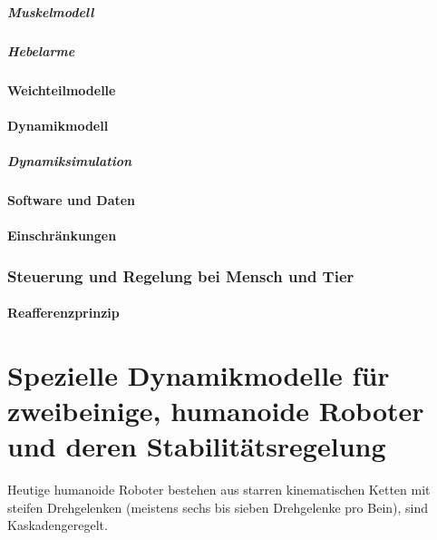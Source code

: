 \documentclass[a4paper, 11pt, accentcolor = tud3b]{tudreport}
\begin{document}
						\subparagraph{Muskelmodell} %

						\subparagraph{Hebelarme} %

					\paragraph{Weichteilmodelle} %

					\paragraph{Dynamikmodell} %

						\subparagraph{Dynamiksimulation} %

					\paragraph{Software und Daten} %

					\paragraph{Einschränkungen} %

				\subsubsection{Steuerung und Regelung bei Mensch und Tier} %

					\paragraph{Reafferenzprinzip} %

		\section{Spezielle Dynamikmodelle für zweibeinige, humanoide Roboter und deren Stabilitätsregelung}
			Heutige humanoide Roboter bestehen aus starren kinematischen Ketten mit steifen Drehgelenken (meistens sechs bis sieben Drehgelenke pro Bein), sind Kaskadengeregelt.
			
\end{document}
